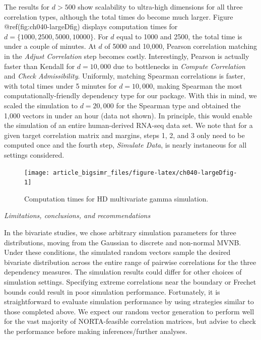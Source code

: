 \documentclass[
]{jss}
\begin{document}
The results for \(d > 500\) show scalability to ultra-high dimensions
for all three correlation types, although the total times do become much
larger. Figure @ref(fig:ch040-largeDfig) displays computation times for
\(d=\{1000, 2500, 5000, 10000\}\). For \(d\) equal to 1000 and 2500, the
total time is under a couple of minutes. At \(d\) of 5000 and 10,000,
Pearson correlation matching in the \emph{Adjust Correlation} step
becomes costly. Interestingly, Pearson is actually faster than Kendall
for \(d=10,000\) due to bottlenecks in \emph{Compute Correlation} and
\emph{Check Admissibility}. Uniformly, matching Spearman correlations is
faster, with total times under 5 minutes for \(d=10,000\), making
Spearman the most computationally-friendly dependency type for our
package. With this in mind, we scaled the simulation to \(d=20,000\) for
the Spearman type and obtained the 1,000 vectors in under an hour (data
not shown). In principle, this would enable the simulation of an entire
human-derived RNA-seq data set. We note that for a given target
correlation matrix and margins, steps 1, 2, and 3 only need to be
computed once and the fourth step, \emph{Simulate Data}, is nearly
instaneous for all settings considered.

\begin{CodeChunk}
\begin{figure}

{\centering \texttt{[image: article\_bigsimr\_files/figure-latex/ch040-largeDfig-1]} 

}

\caption[Computation times for HD multivariate gamma simulation]{Computation times for HD multivariate gamma simulation.}\label{fig:ch040-largeDfig}
\end{figure}
\end{CodeChunk}

\emph{Limitations, conclusions, and recommendations}

In the bivariate studies, we chose arbitrary simulation parameters for
three distributions, moving from the Gaussian to discrete and non-normal
MVNB. Under these conditions, the simulated random vectors sample the
desired bivariate distribution across the entire range of pairwise
correlations for the three dependency measures. The simulation results
could differ for other choices of simulation settings. Specifying
extreme correlations near the boundary or Frechet bounds could result in
poor simulation performance. Fortunately, it is straightforward to
evaluate simulation performance by using strategies similar to those
completed above. We expect our random vector generation to perform well
for the vast majority of NORTA-feasible correlation matrices, but advise
to check the performance before making inferences/further analyses.
\end{document}
